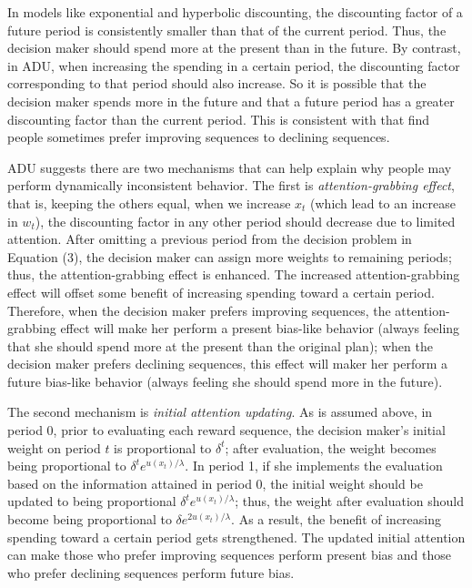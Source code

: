 \documentclass[
  12pt,
]{article}
\begin{document}
In models like exponential and hyperbolic discounting, the discounting
factor of a future period is consistently smaller than that of the
current period. Thus, the decision maker should spend more at the
present than in the future. By contrast, in ADU, when increasing the
spending in a certain period, the discounting factor corresponding to
that period should also increase. So it is possible that the decision
maker spends more in the future and that a future period has a greater
discounting factor than the current period. This is consistent with
\citet{loewenstein_preferences_1993} that find people sometimes prefer
improving sequences to declining sequences.

ADU suggests there are two mechanisms that can help explain why people
may perform dynamically inconsistent behavior. The first is
\emph{attention-grabbing effect}, that is, keeping the others equal,
when we increase \(x_t\) (which lead to an increase in \(w_t\)), the
discounting factor in any other period should decrease due to limited
attention. After omitting a previous period from the decision problem in
Equation (3), the decision maker can assign more weights to remaining
periods; thus, the attention-grabbing effect is enhanced. The increased
attention-grabbing effect will offset some benefit of increasing
spending toward a certain period. Therefore, when the decision maker
prefers improving sequences, the attention-grabbing effect will make her
perform a present bias-like behavior (always feeling that she should
spend more at the present than the original plan); when the decision
maker prefers declining sequences, this effect will maker her perform a
future bias-like behavior (always feeling she should spend more in the
future).

The second mechanism is \emph{initial attention updating}. As is assumed
above, in period 0, prior to evaluating each reward sequence, the
decision maker's initial weight on period \(t\) is proportional to
\(\delta^t\); after evaluation, the weight becomes being proportional to
\(\delta^t e^{u(x_t)/\lambda}\). In period 1, if she implements the
evaluation based on the information attained in period 0, the initial
weight should be updated to being proportional
\(\delta^t e^{u(x_t)/\lambda}\); thus, the weight after evaluation
should become being proportional to \(\delta e^{2u(x_t)/\lambda}\). As a
result, the benefit of increasing spending toward a certain period gets
strengthened. The updated initial attention can make those who prefer
improving sequences perform present bias and those who prefer declining
sequences perform future bias.
\end{document}

